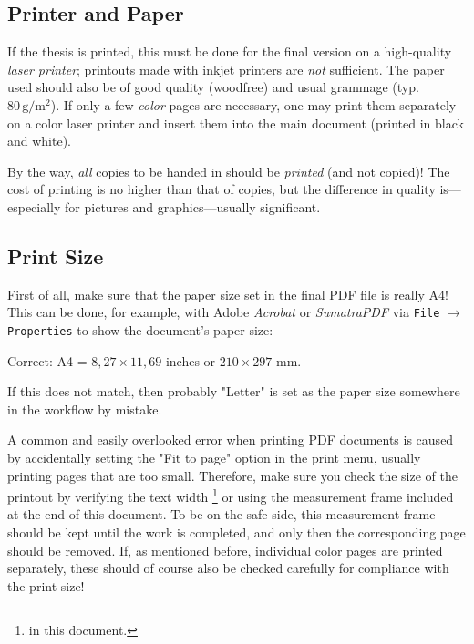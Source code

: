 \subsection{Printer and Paper}

If the thesis is printed, this must be done for the final version on a
high-quality \emph{laser printer}; printouts made with inkjet printers are
\emph{not} sufficient. The paper used should also be of good quality (woodfree)
and usual grammage (typ.\ $80\,\mathrm{g} / \mathrm{m}^2$). If only a few
\emph{color} pages are necessary, one may print them separately on a color laser
printer and insert them into the main document (printed in black and white).

By the way, \emph{all} copies to be handed in should be \emph{printed} (and not 
copied)! The cost of printing is no higher than that of copies, but the difference
in quality is---especially for pictures and graphics---usually significant.


\subsection{Print Size}

First of all, make sure that the paper size set in the final PDF file is really
\textrm{A4}! This can be done, for example, with Adobe \emph{Acrobat} or 
\emph{SumatraPDF} via \texttt{File} $\rightarrow$ \texttt{Properties} 
to show the document's paper size:
%
\begin{center}
	\textrm{Correct:} A4 = $8{,}27 \times 11{,}69$ inches or $210 \times 297$ mm.
\end{center}
%
If this does not match, then probably "Letter" is set as the paper size somewhere
in the workflow by mistake.

A common and easily overlooked error when printing PDF documents is caused by 
accidentally setting the "Fit to page" option in the print menu, usually printing 
pages that are too small. Therefore, make sure you check the size of the printout 
by verifying the text width%
\footnote{\Convert[unit=mm]{\the\textwidth}	in this document.} %
or using the measurement frame included at the end of this document.
To be on the safe side, this measurement frame should be kept until the work 
is completed, and only then the corresponding page should be removed.
If, as mentioned before, individual color pages are printed separately, these 
should of course also be checked carefully for compliance with the print size!